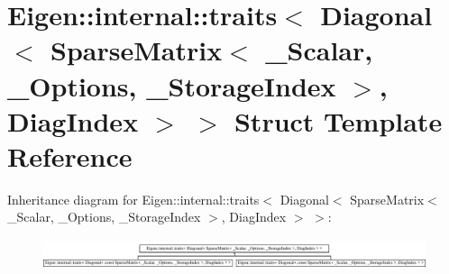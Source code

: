 \hypertarget{struct_eigen_1_1internal_1_1traits_3_01_diagonal_3_01_sparse_matrix_3_01___scalar_00_01___option6bd26e34064fdba33a44f3bb621d4cca}{}\section{Eigen\+:\+:internal\+:\+:traits$<$ Diagonal$<$ Sparse\+Matrix$<$ \+\_\+\+Scalar, \+\_\+\+Options, \+\_\+\+Storage\+Index $>$, Diag\+Index $>$ $>$ Struct Template Reference}
\label{struct_eigen_1_1internal_1_1traits_3_01_diagonal_3_01_sparse_matrix_3_01___scalar_00_01___option6bd26e34064fdba33a44f3bb621d4cca}
Inheritance diagram for Eigen\+:\+:internal\+:\+:traits$<$ Diagonal$<$ Sparse\+Matrix$<$ \+\_\+\+Scalar, \+\_\+\+Options, \+\_\+\+Storage\+Index $>$, Diag\+Index $>$ $>$\+:\begin{figure}[H]
\begin{center}
\leavevmode
\includegraphics[height=0.898876cm]{struct_eigen_1_1internal_1_1traits_3_01_diagonal_3_01_sparse_matrix_3_01___scalar_00_01___option6bd26e34064fdba33a44f3bb621d4cca}
\end{center}
\end{figure}
